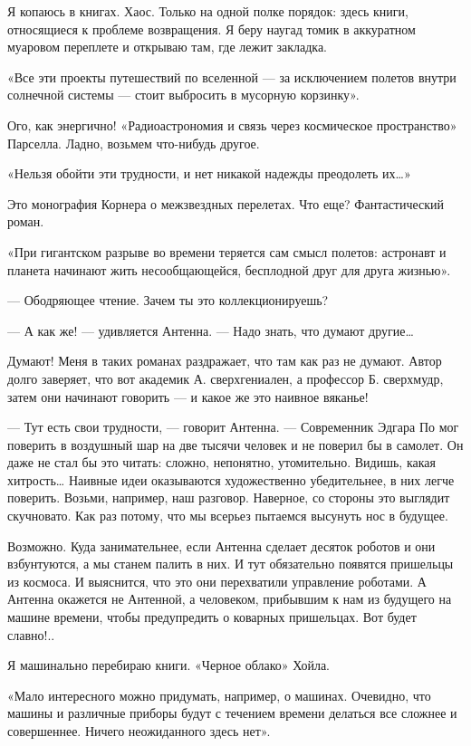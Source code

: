 Я копаюсь в  книгах. Хаос.  Только на  одной полке  порядок: здесь  книги,
относящиеся к  проблеме  возвращения. Я  беру  наугад томик  в  аккуратном
муаровом переплете и открываю там, где лежит закладка.

«Все эти проекты путешествий по вселенной — за исключением полетов  внутри
солнечной системы — стоит выбросить в мусорную корзинку».

Ого,  как   энергично!   «Радиоастрономия  и   связь   через   космическое
пространство» Парселла. Ладно, возьмем что-нибудь другое.

«Нельзя обойти эти трудности, и нет никакой надежды преодолеть их…»

Это монография Корнера  о межзвездных перелетах.  Что еще?  Фантастический
роман.

«При гигантском разрыве во времени теряется сам смысл полетов: астронавт и
планета начинают жить несообщающейся, бесплодной друг для друга жизнью».

— Ободряющее чтение. Зачем ты это коллекционируешь?

— А как же! — удивляется Антенна. — Надо знать, что думают другие…

Думают! Меня в таких романах раздражает, что там как раз не думают.  Автор
долго  заверяет,  что  вот  академик  А.  сверхгениален,  а  профессор  Б.
сверхмудр, затем они начинают говорить — и какое же это наивное вяканье!

— Тут есть свои трудности, — говорит Антенна. — Современник Эдгара По  мог
поверить в воздушный шар на две тысячи человек и не поверил бы в  самолет.
Он даже не  стал бы  это читать: сложно,  непонятно, утомительно.  Видишь,
какая хитрость… Наивные идеи оказываются художественно убедительнее, в них
легче поверить. Возьми, например, наш  разговор. Наверное, со стороны  это
выглядит скучновато. Как раз потому, что мы всерьез пытаемся высунуть  нос
в будущее.

Возможно. Куда занимательнее, если Антенна  сделает десяток роботов и  они
взбунтуются, а  мы  станем  палить  в  них.  И  тут  обязательно  появятся
пришельцы из  космоса. И  выяснится, что  это они  перехватили  управление
роботами. А Антенна окажется не Антенной, а человеком, прибывшим к нам  из
будущего на машине времени, чтобы предупредить о коварных пришельцах.  Вот
будет славно!..

Я машинально перебираю книги. «Черное облако» Хойла.

«Мало интересного  можно придумать,  например,  о машинах.  Очевидно,  что
машины и различные приборы будут с течением времени делаться все сложнее и
совершеннее. Ничего неожиданного здесь нет».


